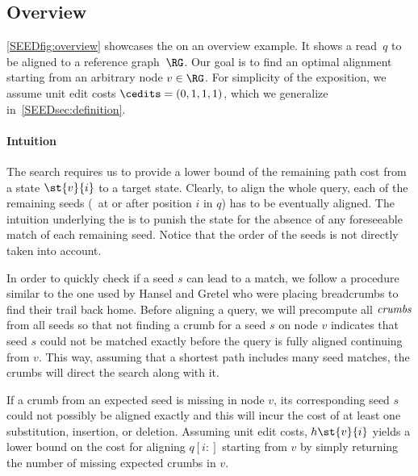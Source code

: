 

\subsection{Overview} \label{SEEDsec:overview}
\cref{SEEDfig:overview} showcases the \seedh on an overview example. It shows a
read~$q$ to be aligned to a reference graph~$\RG$. Our goal is to find an
optimal alignment starting from an arbitrary node $v \in \RG$.
%
For simplicity of the exposition, we assume unit edit costs $\cedits =
(0,1,1,1)$, which we generalize in~\cref{SEEDsec:definition}.

\paragraph{Intuition}
The \A search requires us to provide a lower bound of the remaining path cost
from a state $\st{v}{i}$ to a target state. Clearly, to align the whole query,
each of the remaining seeds (\ie~at or after position $i$ in $q$) has to be
eventually aligned. The intuition underlying the \seedh is to punish the state
for the absence of any foreseeable match of each remaining seed. Notice that the
order of the seeds is not directly taken into account.

In order to quickly check if a seed $s$ can lead to a match, we follow a
procedure similar to the one used by Hansel and Gretel who were placing
breadcrumbs to find their trail back home. Before aligning a query, we will
precompute all $\emph{crumbs}$ from all seeds so that not finding a crumb for
a seed $s$ on node $v$ indicates that seed $s$ could not be matched exactly
before the query is fully aligned continuing from $v$. This way, assuming that a
shortest path includes many seed matches, the crumbs will direct the \A search
along with it.

If a crumb from an expected seed is missing in node $v$, its corresponding seed
$s$ could not possibly be aligned exactly and this will incur the cost of at
least one substitution, insertion, or deletion. Assuming unit edit costs,
$h\st{v}{i}$ yields a lower bound on the cost for aligning $q[i{:}]$ starting
from $v$ by simply returning the number of missing expected crumbs in $v$.


